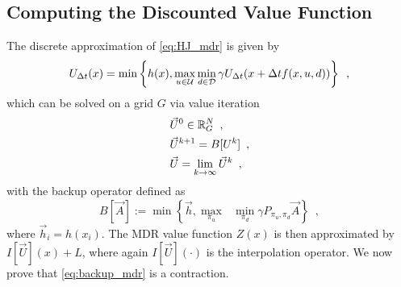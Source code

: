 %


%





\subsection{Computing the Discounted Value Function}
The discrete approximation of \eqref{eq:HJ_mdr} is given by
%
\begin{equation}\label{eq:U_approx}
    U_{\Delta t} (x) = \min\left\{h(x), \max_{u\in\mathcal{U}} \min_{ d\in\mathcal{D}}  \gamma U_{\Delta t}(x+\Delta tf(x,u,d))\right\} \enspace,
\end{equation}%
\noindent which can be solved on a grid $G$ via value iteration 
%
\begin{subequations} \label{eq:val_iter_backup}
\begin{align}
&\vec{U}^{0} \in \mathbb{R}^N_G \enspace,\\
&\vec{U}^{k+1} = B[U^k] \enspace,\\
&\vec{U} = \lim_{k\rightarrow \infty} \vec{U}^{k} \enspace,
\end{align}
\end{subequations}%
\noindent with the backup operator defined as
%
\begin{equation} \label{eq:backup_mdr}
B[\vec{A}] := \min\left\{ \vec{h}, \underset{\pi_u}{\max}\text{ }\underset{ \pi_d}{\min} \gamma P_{\pi_u, \pi_d} \vec{A} \right \}
\enspace,
\end{equation}%
\noindent where $\vec{h}_i = h(x_i)$. The MDR value function $Z(x)$ is then approximated by $I[\vec{U}](x)+L$, where again $I[\vec{U}](\cdot)$ is the interpolation operator. We now prove that \eqref{eq:backup_mdr} is a contraction.

